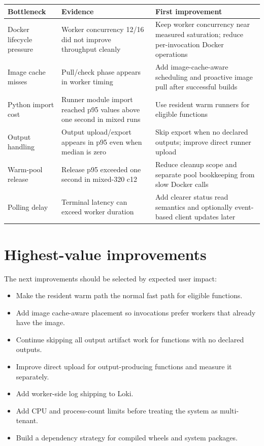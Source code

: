 \documentclass[12pt,a4paper]{report}
\begin{document}
\begin{longtable}{p{}p{}p{}}
\toprule
\textbf{Bottleneck} & \textbf{Evidence} & \textbf{First improvement} \\
\midrule
Docker lifecycle pressure & Worker concurrency 12/16 did not improve throughput cleanly & Keep worker concurrency near measured saturation; reduce per-invocation Docker operations \\
Image cache misses & Pull/check phase appears in worker timing & Add image-cache-aware scheduling and proactive image pull after successful builds \\
Python import cost & Runner module import reached p95 values above one second in mixed runs & Use resident warm runners for eligible functions \\
Output handling & Output upload/export appears in p95 even when median is zero & Skip export when no declared outputs; improve direct runner upload \\
Warm-pool release & Release p95 exceeded one second in mixed-320 c12 & Reduce cleanup scope and separate pool bookkeeping from slow Docker calls \\
Polling delay & Terminal latency can exceed worker duration & Add clearer status read semantics and optionally event-based client updates later \\
\bottomrule
\end{longtable}

\section{Highest-value improvements}

The next improvements should be selected by expected user impact:

\begin{itemize}[leftmargin=1.2cm]
  \item Make the resident warm path the normal fast path for eligible functions.
  \item Add image cache-aware placement so invocations prefer workers that already have the image.
  \item Continue skipping all output artifact work for functions with no declared outputs.
  \item Improve direct upload for output-producing functions and measure it separately.
  \item Add worker-side log shipping to Loki.
  \item Add CPU and process-count limits before treating the system as multi-tenant.
  \item Build a dependency strategy for compiled wheels and system packages.
\end{itemize}
\end{document}

